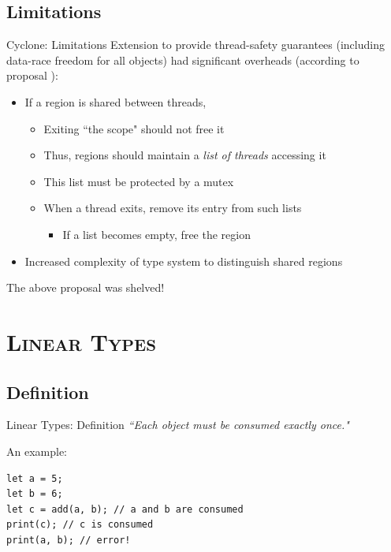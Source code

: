 \documentclass[xcolor=x11names,compress]{beamer}
\renewcommand{\(}{\begin{columns}}
\renewcommand{\)}{\end{columns}}
\newcommand{\<}[1]{\begin{column}{#1}}
\renewcommand{\>}{\end{column}}
\begin{document}
\subsection{Limitations}
\begin{frame}{Cyclone: Limitations}
    Extension to provide thread-safety guarantees (including data-race freedom for all objects) had significant overheads (according to proposal \cite{grossmanthread}):
    \pause
    \begin{itemize}
        \item If a region is shared between threads,
        \begin{itemize}
            \item Exiting ``the scope" should not free it
            \pause
            \item Thus, regions should maintain a \textit{list of threads} accessing it
            \pause
            \item This list must be protected by a mutex
            \pause
            \item When a thread exits, remove its entry from such lists
            \pause
            \begin{itemize}
                \item If a list becomes empty, free the region
            \end{itemize}
        \end{itemize}
        \pause
        \item Increased complexity of type system to distinguish shared regions
    \end{itemize}
    \pause
    The above proposal was shelved!
\end{frame}

\section{\scshape Linear Types}
\subsection{Definition}
\begin{frame}[fragile]{Linear Types: Definition}
\textit{``Each object must be consumed exactly once."}

\vspace{1.6em}

An example:
\begin{lstlisting}
let a = 5;
let b = 6;
let c = add(a, b); // a and b are consumed
print(c); // c is consumed
print(a, b); // error!
\end{lstlisting}
\end{frame}
\end{document}
